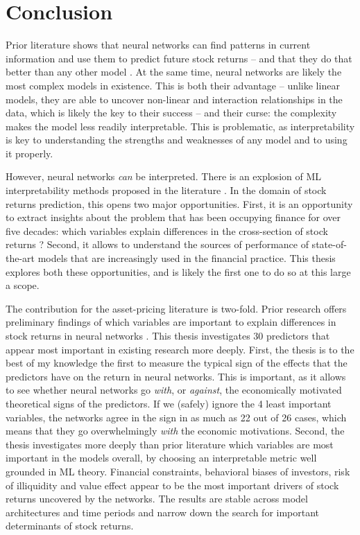 \chapter{Conclusion}
\label{con}

Prior literature shows that neural networks can find patterns in current information and use them to predict future stock returns -- and that they do that better than any other model \citep[e.g.][]{gu2020empirical, tobek2020does}. At the same time, neural networks are likely the most complex models in existence. This is both their advantage -- unlike linear models, they are able to uncover non-linear and interaction relationships in the data, which is likely the key to their success  \citep[e.g.][]{bryzgalova2019forest, gu2020empirical} -- and their curse: the complexity makes the model less readily interpretable. This is problematic, as interpretability is key to understanding the strengths and weaknesses of any model and to using it properly. 

However, neural networks \textit{can} be interpreted. There is an explosion of ML interpretability methods proposed in the literature \citep[e.g.][]{molnar2020interpretable}. In the domain of stock returns prediction, this opens two major opportunities. First, it is an opportunity to extract insights about the problem that has been occupying finance for over five decades: which variables explain differences in the cross-section of stock returns \citep{cochrane2011presidential}? Second, it allows to understand the sources of performance of state-of-the-art models that are increasingly used in the financial practice. This thesis explores both these opportunities, and is likely the first one to do so at this large a scope.   

The contribution for the asset-pricing literature is two-fold. Prior research offers preliminary findings of which variables are important to explain differences in stock returns in neural networks \citep{gu2020empirical, tobek2020does}. This thesis investigates 30 predictors that appear most important in existing research more deeply. First, the thesis is to the best of my knowledge the first to measure the typical sign of the effects that the predictors have on the return in neural networks. This is important, as it allows to see whether neural networks go \textit{with}, or \textit{against}, the economically motivated theoretical signs of the predictors. If we (safely) ignore the 4 least important variables, the networks agree in the sign in as much as 22 out of 26 cases, which means that they go overwhelmingly \textit{with} the economic motivations. Second, the thesis investigates more deeply than prior literature which variables are most important in the models overall, by choosing an interpretable metric well grounded in ML theory. Financial constraints, behavioral biases of investors, risk of illiquidity and value effect appear to be the most important drivers of stock returns uncovered by the networks. The results are stable across model architectures and time periods and narrow down the search for important determinants of stock returns.

